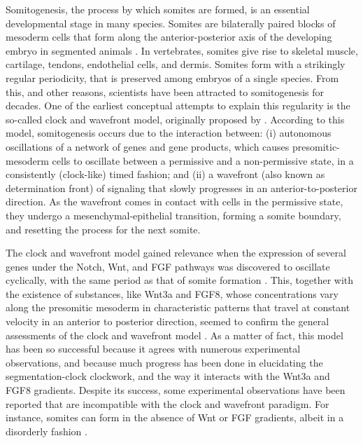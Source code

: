 \documentclass[%
 preprint,
 amsmath,amssymb,
 aps,
]{revtex4-2}
\begin{document}
	Somitogenesis, the process by which somites are formed, is an essential
	developmental stage in many species. Somites are bilaterally paired blocks of
	mesoderm cells that form along the anterior-posterior axis of the developing
	embryo in segmented animals \citep{Maroto2012}. In vertebrates, somites give
	rise to skeletal muscle, cartilage, tendons, endothelial cells, and dermis.
	Somites form with a strikingly regular periodicity, that is preserved among
	embryos of a single species. From this, and other reasons, scientists have been
	attracted to somitogenesis for decades. One of the earliest conceptual attempts
	to explain this regularity is the so-called clock and wavefront model,
	originally proposed by \citet{Cooke1976}. According to this model, somitogenesis
	occurs due to the interaction between: (i) autonomous oscillations of a network
	of genes and gene products, which causes presomitic-mesoderm cells to oscillate
	between a permissive and a non-permissive state, in a consistently (clock-like)
	timed fashion; and (ii) a wavefront (also known as determination front) of
	signaling that slowly progresses in an anterior-to-posterior direction. As the
	wavefront comes in contact with cells in the permissive state, they undergo a
	mesenchymal-epithelial transition, forming a somite boundary, and resetting the
	process for the next somite.
	
	The clock and wavefront model gained relevance when the expression of several
	genes under the Notch, Wnt, and FGF pathways was discovered to oscillate
	cyclically, with the same period as that of somite formation
	\citep{Palmeirim1997, Pourquie2001, Gibb2010, Pourquie2011}. This, together with
	the existence of substances, like Wnt3a and FGF8, whose concentrations
	vary along the presomitic mesoderm in characteristic patterns that travel at
	constant velocity in an anterior to posterior direction, seemed to confirm the
	general assessments of the clock and wavefront model \citep{Dubrulle2001,
		Gibb2010, Pourquie2011}. As a matter of fact, this model has been so
	successful because it agrees with numerous experimental observations, and
	because much progress has been done in elucidating the segmentation-clock
	clockwork, and the way it interacts with the Wnt3a and FGF8 gradients.
	Despite its success, some experimental observations have been reported that are
	incompatible with the clock and wavefront paradigm. For instance, somites can
	form in the absence of Wnt or FGF gradients, albeit in a disorderly
	fashion \citep{Naiche2011,Dias2014}.
	
\end{document}
